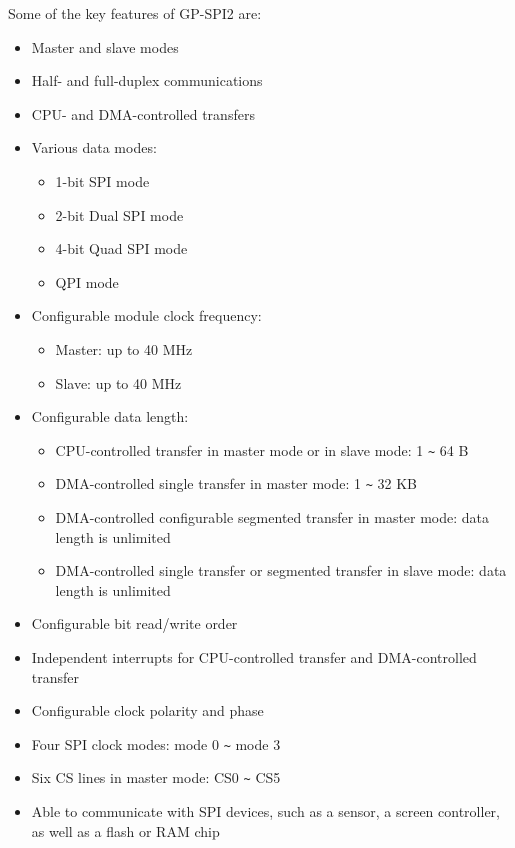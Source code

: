 \documentclass[main\_\_EN.tex]{subfiles}
\begin{document}
Some of the key features of GP-SPI2 are:
\begin{itemize}
    \item Master and slave modes
    \item Half- and full-duplex communications
    \item CPU- and DMA-controlled transfers
    \item Various data modes:
        \begin{itemize}
            \item 1-bit SPI mode
            \item 2-bit Dual SPI mode
            \item 4-bit Quad SPI mode
            \item QPI mode
        \end{itemize}
    \item Configurable module clock frequency:
        \begin{itemize}
            \item Master: up to 40 MHz
            \item Slave: up to 40 MHz
        \end{itemize}
    \item Configurable data length:
    \begin{itemize}
        \item CPU-controlled transfer in master mode or in slave mode: 1 \verb+~+ 64 B
        \item DMA-controlled single transfer in master mode: 1 \verb+~+ 32 KB
        \item DMA-controlled configurable segmented transfer in master mode: data length is unlimited
        \item DMA-controlled single transfer or segmented transfer in slave mode: data length is unlimited
    \end{itemize}
    \item Configurable bit read/write order
    \item Independent interrupts for CPU-controlled transfer and DMA-controlled transfer
    \item Configurable clock polarity and phase
    \item Four SPI clock modes: mode 0 \verb+~+ mode 3
    \item Six CS lines in master mode: CS0 \verb+~+ CS5
    \item Able to communicate with SPI devices, such as a sensor, a screen controller, as well as a flash or RAM chip
\end{itemize}
\end{document}
